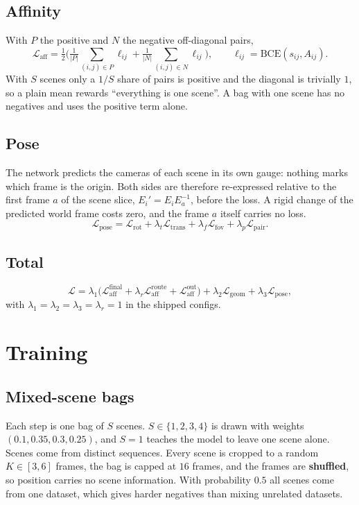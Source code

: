 \documentclass[11pt, a4paper]{article}
\newcommand{\Lall}{\mathcal{L}}
\begin{document}
\subsection{Affinity}
With $P$ the positive and $N$ the negative off-diagonal pairs,
\begin{equation}
  \Lall_{\text{aff}} = \tfrac12\Big(\tfrac{1}{|P|}\sum_{(i,j)\in P}\ell_{ij} + \tfrac{1}{|N|}\sum_{(i,j)\in N}\ell_{ij}\Big),
  \qquad \ell_{ij} = \mathrm{BCE}(s_{ij}, A_{ij}).
\end{equation}
With $S$ scenes only a $1/S$ share of pairs is positive and the diagonal is trivially $1$, so a
plain mean rewards ``everything is one scene''. A bag with one scene has no negatives and uses
the positive term alone.

\subsection{Pose}
The network predicts the cameras of each scene in its own gauge: nothing marks which frame is the
origin. Both sides are therefore re-expressed relative to the first frame $a$ of the scene slice,
$E_i' = E_i E_a^{-1}$, before the loss. A rigid change of the predicted world frame costs zero,
and the frame $a$ itself carries no loss.
\begin{equation}
  \Lall_{\text{pose}} = \Lall_{\text{rot}} + \lambda_t \Lall_{\text{trans}} + \lambda_f \Lall_{\text{fov}} + \lambda_p \Lall_{\text{pair}} .
\end{equation}

\subsection{Total}
\begin{equation}
  \Lall = \lambda_1 \big(\Lall_{\text{aff}}^{\text{final}} + \lambda_r \Lall_{\text{aff}}^{\text{route}} + \Lall_{\text{aff}}^{\text{out}}\big)
        + \lambda_2 \Lall_{\text{geom}} + \lambda_3 \Lall_{\text{pose}},
\end{equation}
with $\lambda_1=\lambda_2=\lambda_3=\lambda_r=1$ in the shipped configs.

\section{Training}

\subsection{Mixed-scene bags}
Each step is one bag of $S$ scenes. $S \in \{1,2,3,4\}$ is drawn with weights $(0.1, 0.35, 0.3, 0.25)$,
and $S=1$ teaches the model to leave one scene alone. Scenes come from distinct sequences. Every
scene is cropped to a random $K \in [3, 6]$ frames, the bag is capped at $16$ frames, and the
frames are \textbf{shuffled}, so position carries no scene information. With probability $0.5$ all scenes
come from one dataset, which gives harder negatives than mixing unrelated datasets.
\end{document}
